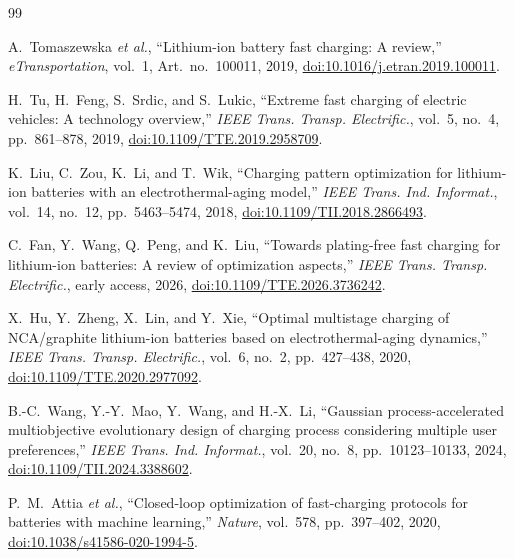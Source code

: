 \begin{thebibliography}{99}

A.~Tomaszewska \textit{et al.}, ``Lithium-ion battery fast charging: A
review,'' \textit{eTransportation}, vol.~1, Art.~no.~100011, 2019,
\href{https://doi.org/10.1016/j.etran.2019.100011}
{doi:10.1016/\allowbreak j.etran.2019.100011}.

H.~Tu, H.~Feng, S.~Srdic, and S.~Lukic, ``Extreme fast charging of electric
vehicles: A technology overview,'' \textit{IEEE Trans. Transp. Electrific.},
vol.~5, no.~4, pp.~861--878, 2019,
\href{https://doi.org/10.1109/TTE.2019.2958709}
{doi:10.1109/TTE.2019.2958709}.

K.~Liu, C.~Zou, K.~Li, and T.~Wik, ``Charging pattern optimization for
lithium-ion batteries with an electrothermal-aging model,''
\textit{IEEE Trans. Ind. Informat.}, vol.~14, no.~12, pp.~5463--5474, 2018,
\href{https://doi.org/10.1109/TII.2018.2866493}
{doi:10.1109/TII.2018.2866493}.

C.~Fan, Y.~Wang, Q.~Peng, and K.~Liu, ``Towards plating-free fast charging for
lithium-ion batteries: A review of optimization aspects,''
\textit{IEEE Trans. Transp. Electrific.}, early access, 2026,
\href{https://doi.org/10.1109/TTE.2026.3736242}
{doi:10.1109/TTE.2026.3736242}.

X.~Hu, Y.~Zheng, X.~Lin, and Y.~Xie, ``Optimal multistage charging of
NCA/graphite lithium-ion batteries based on electrothermal-aging dynamics,''
\textit{IEEE Trans. Transp. Electrific.}, vol.~6, no.~2, pp.~427--438, 2020,
\href{https://doi.org/10.1109/TTE.2020.2977092}
{doi:10.1109/TTE.2020.2977092}.

B.-C.~Wang, Y.-Y.~Mao, Y.~Wang, and H.-X.~Li,
``Gaussian process-accelerated multiobjective evolutionary design of charging
process considering multiple user preferences,''
\textit{IEEE Trans. Ind. Informat.}, vol.~20, no.~8, pp.~10123--10133, 2024,
\href{https://doi.org/10.1109/TII.2024.3388602}
{doi:10.1109/TII.2024.3388602}.

P.~M.~Attia \textit{et al.}, ``Closed-loop optimization of fast-charging
protocols for batteries with machine learning,'' \textit{Nature}, vol.~578,
pp.~397--402, 2020,
\href{https://doi.org/10.1038/s41586-020-1994-5}
{doi:10.1038/s41586-020-1994-5}.


\end{thebibliography}
